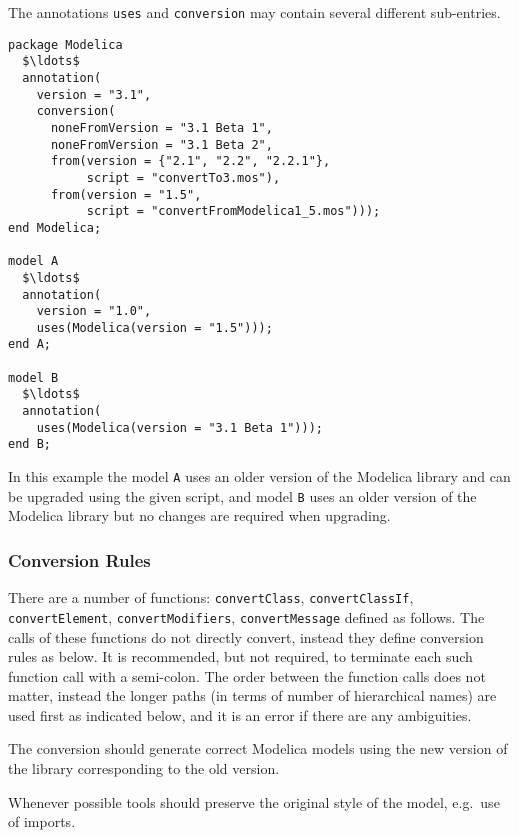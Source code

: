 The annotations \lstinline!uses! and \lstinline!conversion! may contain several different sub-entries.

\begin{example}
\begin{lstlisting}[language=modelica]
package Modelica
  $\ldots$
  annotation(
    version = "3.1",
    conversion(
      noneFromVersion = "3.1 Beta 1",
      noneFromVersion = "3.1 Beta 2",
      from(version = {"2.1", "2.2", "2.2.1"},
           script = "convertTo3.mos"),
      from(version = "1.5",
           script = "convertFromModelica1_5.mos")));
end Modelica;

model A
  $\ldots$
  annotation(
    version = "1.0",
    uses(Modelica(version = "1.5")));
end A;

model B
  $\ldots$
  annotation(
    uses(Modelica(version = "3.1 Beta 1")));
end B;
\end{lstlisting}
In this example the model \lstinline!A! uses an older version of the
Modelica library and can be upgraded using the given script, and model
\lstinline!B! uses an older version of the Modelica library but no changes are
required when upgrading.
\end{example}

\subsubsection{Conversion Rules}\label{conversion-rules}

There are a number of functions: \lstinline!convertClass!, \lstinline!convertClassIf!,
\lstinline!convertElement!, \mbox{\lstinline!convertModifiers!,} \lstinline!convertMessage! defined as follows. The
calls of these functions do not directly convert, instead they define
conversion rules as below.
It is recommended, but not required, to terminate each such function call with a semi-colon.
The order between the function calls does not matter, instead the longer paths (in terms of number of hierarchical names)
are used first as indicated below, and it is an error if there are any
ambiguities.

The conversion should generate correct Modelica models using the new version of the library
corresponding to the old version.

\begin{nonnormative}
Whenever possible tools should preserve the original style of the model, e.g.\ use of imports.
\end{nonnormative}

